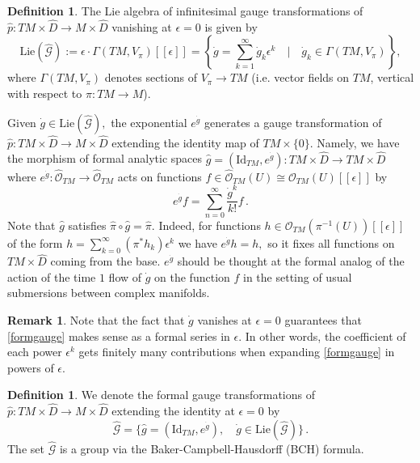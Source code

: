\documentclass{article}
\theoremstyle{definition}
\newtheorem{definition}[theorem]{Definition}
\newtheorem{remark}[theorem]{Remark}
\numberwithin{equation}{section}
\begin{document}
\begin{definition}\label{formalgauge} 
The Lie algebra of infinitesimal gauge transformations of $\widehat{p}:TM\times \widehat{D}\to M\times \widehat{D}$ vanishing at $\epsilon =0$ is given by 
\begin{equation*}
    \text{Lie}(\widehat{\mathcal{G}}):=\epsilon\cdot \Gamma(TM,V_{\pi})[[\epsilon]]=\left\{\dot{g}=\sum_{k=1}^{\infty}\dot{g}_k\epsilon^k \quad \Bigg| \quad \dot{g}_k\in \Gamma(TM,V_{\pi})\right\},
\end{equation*}
where $\Gamma(TM,V_{\pi})$ denotes  sections of $V_{\pi}\to TM$ (i.e. vector fields on $TM$, vertical with respect to $\pi:TM \to M$).
\end{definition}
Given $\dot{g}\in \text{Lie}(\widehat{\mathcal{G}}),$ the exponential $e^{\dot{g}}$ generates a gauge transformation of $\widehat{p}:TM\times \widehat{D}\to M\times \widehat{D}$ extending the identity map of $TM\times \{0\}$. Namely, we have the morphism of formal analytic spaces $\hat{g} = (\text{Id}_{TM}, e^{\dot{g}}):TM\times \widehat{D}\to TM\times \widehat{D}$ where $e^{\dot{g}}: \widehat{\mathcal{O}}_{TM}\to \widehat{\mathcal{O}}_{TM}$ acts on functions $f\in \hat{\mathcal{O}}_{TM}(U)\cong \mathcal{O}_{TM}(U)[[\epsilon]]$ by \begin{equation}\label{formgauge}
    e^{\dot{g}}f=\sum_{n=0}^{\infty}\frac{\dot{g}^k}{k!}f\,.
\end{equation}
Note that $\hat{g}$ satisfies $\hat{\pi}\circ \hat{g}=\hat{\pi}$. 
Indeed, for functions $h\in \mathcal{O}_{TM}(\pi^{-1}(U))[[\epsilon]]$ of the form $h=\sum_{k=0}^{\infty}(\pi^*h_k)\epsilon^k$ we have $e^{\dot{g}}h=h,$ so it fixes all functions on $TM\times \widehat{D}$ coming from the base.
$e^{\dot{g}}$ should be thought at the formal analog of the action of the time $1$ flow of $\dot{g}$ on the function $f$ in the setting of usual submersions between complex manifolds. 

\begin{remark} Note that the fact that $\dot{g}$ vanishes at $\epsilon=0$ guarantees that \eqref{formgauge} makes sense as a formal series in $\epsilon$. In other words, the coefficient of each power $\epsilon^k$ gets finitely many contributions when expanding \eqref{formgauge} in powers of $\epsilon$. 
\end{remark}

\begin{definition}
    We denote the formal gauge transformations of $\widehat{p}:TM\times \widehat{D}\to M\times \widehat{D}$ extending the identity at $\epsilon=0$ by
    \begin{equation*}
        \widehat{\mathcal{G}}=\{\widehat{g}=(\text{Id}_{TM}, e^{\dot{g}}), \quad \dot{g}\in \text{Lie}(\widehat{\mathcal{G}})\}\,.
    \end{equation*}
    The set $\widehat{\mathcal{G}}$ is a group via the Baker-Campbell-Hausdorff (BCH) formula. 
\end{definition}
\end{document}
